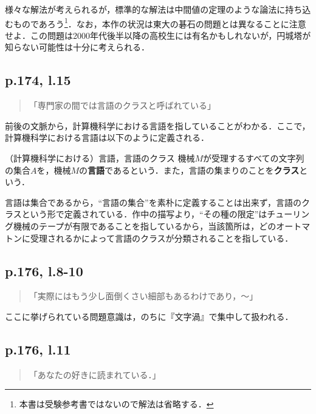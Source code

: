 \documentclass[10pt, a5paper, twoside]{ltjsarticle}
\begin{document}
            様々な解法が考えられるが，標準的な解法は中間値の定理のような論法に持ち込むものであろう\footnote{本書は受験参考書ではないので解法は省略する．}．なお，本作の状況は東大の碁石の問題とは異なることに注意せよ．この問題は2000年代後半以降の高校生には有名かもしれないが，円城塔が知らない可能性は十分に考えられる．

        \subsection{p.174, l.15}

            \begin{quote}
                「専門家の間では言語のクラスと呼ばれている」
            \end{quote}

            前後の文脈から，計算機科学における言語を指していることがわかる．ここで，計算機科学における言語は以下のように定義される\cite{sipser1}．

            \begin{dfn}{（計算機科学における）言語，言語のクラス}{}
                機械$M$が受理するすべての文字列の集合$A$を，機械$M$の\textbf{言語}であるという．また，言語の集まりのことを\textbf{クラス}という．
            \end{dfn}

            言語は集合であるから，“言語の集合”を素朴に定義することは出来ず，言語のクラスという形で定義されている．作中の描写より，“その種の限定”はチューリング機械のテープが有限であることを指しているから，当該箇所は，どのオートマトンに受理されるかによって言語のクラスが分類されることを指している．

        \subsection{p.176, l.8-10}

            \begin{quote}
                「実際にはもう少し面倒くさい細部もあるわけであり，〜」
            \end{quote}

            ここに挙げられている問題意識は，のちに『文字渦』で集中して扱われる．

        \subsection{p.176, l.11}

            \begin{quote}
                「あなたの好きに読まれている．」
            \end{quote}
\end{document}
